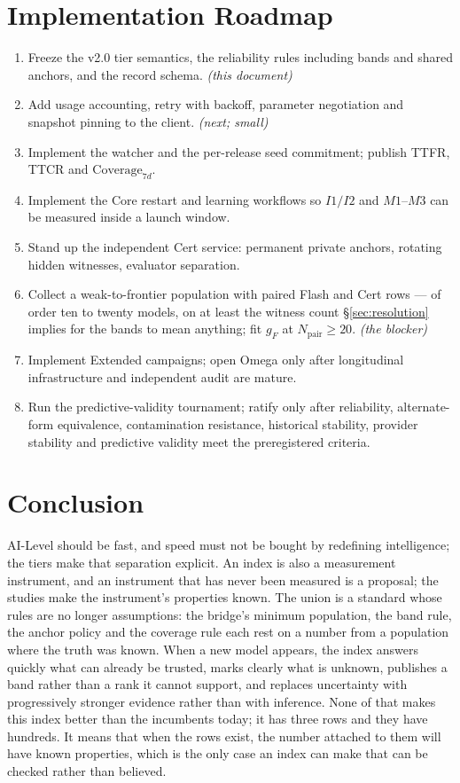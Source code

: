 \documentclass[11pt]{article}
\theoremstyle{definition}
\begin{document}
\section{Implementation Roadmap}\label{sec:roadmap}

\begin{enumerate}[leftmargin=1.6em,itemsep=1pt]
\item Freeze the v2.0 tier semantics, the reliability rules including bands and shared anchors, and the record schema. \emph{(this document)}
\item Add usage accounting, retry with backoff, parameter negotiation and snapshot pinning to the client. \emph{(next; small)}
\item Implement the watcher and the per-release seed commitment; publish TTFR, TTCR and $\mathrm{Coverage}_{7d}$.
\item Implement the Core restart and learning workflows so $I1/I2$ and $M1$--$M3$ can be measured inside a launch window.
\item Stand up the independent Cert service: permanent private anchors, rotating hidden witnesses, evaluator separation.
\item Collect a weak-to-frontier population with paired Flash and Cert rows --- of order ten to twenty models, on at least the witness count \S\ref{sec:resolution} implies for the bands to mean anything; fit $g_F$ at $N_{\text{pair}} \ge 20$. \emph{(the blocker)}
\item Implement Extended campaigns; open Omega only after longitudinal infrastructure and independent audit are mature.
\item Run the predictive-validity tournament; ratify only after reliability, alternate-form equivalence, contamination resistance, historical stability, provider stability and predictive validity meet the preregistered criteria.
\end{enumerate}

\section{Conclusion}\label{sec:conclusion}

AI-Level should be fast, and speed must not be bought by redefining intelligence; the tiers make that separation explicit. An index is also a measurement instrument, and an instrument that has never been measured is a proposal; the studies make the instrument's properties known. The union is a standard whose rules are no longer assumptions: the bridge's minimum population, the band rule, the anchor policy and the coverage rule each rest on a number from a population where the truth was known. When a new model appears, the index answers quickly what can already be trusted, marks clearly what is unknown, publishes a band rather than a rank it cannot support, and replaces uncertainty with progressively stronger evidence rather than with inference. None of that makes this index better than the incumbents today; it has three rows and they have hundreds. It means that when the rows exist, the number attached to them will have known properties, which is the only case an index can make that can be checked rather than believed.
\end{document}
